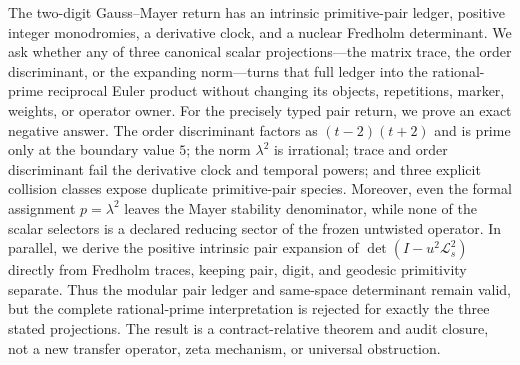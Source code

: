 The two-digit Gauss--Mayer return has an intrinsic primitive-pair ledger,
positive integer monodromies, a derivative clock, and a nuclear Fredholm
determinant.  We ask whether any of three canonical scalar projections---the
matrix trace, the order discriminant, or the expanding norm---turns that full
ledger into the rational-prime reciprocal Euler product without changing its
objects, repetitions, marker, weights, or operator owner.  For the precisely
typed pair return, we prove an exact negative answer.  The order discriminant
factors as $(t-2)(t+2)$ and is prime only at the boundary value $5$; the norm
$\lambda^2$ is irrational; trace and order discriminant fail the derivative
clock and temporal powers; and three explicit collision classes expose
duplicate primitive-pair species.  Moreover, even the formal assignment
$p=\lambda^2$ leaves the Mayer stability denominator, while none of the
scalar selectors is a declared reducing sector of the frozen untwisted
operator.  In parallel, we derive the positive intrinsic pair expansion of
$\det(I-u^2\mathcal L_s^2)$ directly from Fredholm traces, keeping pair,
digit, and geodesic primitivity separate.  Thus the modular pair ledger and
same-space determinant remain valid, but the complete rational-prime
interpretation is rejected for exactly the three stated projections.  The
result is a contract-relative theorem and audit closure, not a new transfer
operator, zeta mechanism, or universal obstruction.
